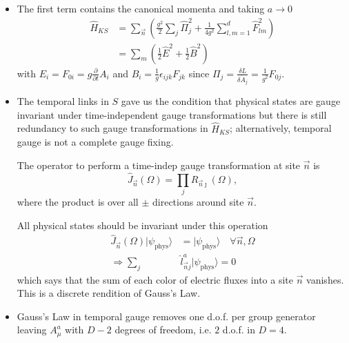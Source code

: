 \begin{itemize}
\begin{itemize}
        where $X$ is an irrelevant constant and $\hat{H}_{KS}$, the contents of the $\{ \}$, is defined to be the Kogut-Susskind Hamiltonian.
        \item The first term contains the canonical momenta and taking $a \rightarrow 0$
        \begin{align*}
            \hat{H}_{KS} &= \sum_{\vec{n}} \left( \frac{g^2}{2} \sum_j \hat{\Pi}_j^2 + \frac{1}{4 g^2} \sum_{l,m = 1}^d \hat{F}_{lm}^2\right)\\
            &= \sum_m\left(\frac{1}{2}\hat{E}^2 + \frac{1}{2}\hat{B}^2\right)
        \end{align*}
        with $E_i = F_{0i} = g \frac{\partial}{\partial t}A_i$ and $B_i = \frac{1}{g} \epsilon_{ijk}F_{jk}$ since $\Pi_j = \frac{\delta L}{\delta \dot{A}_j} = \frac{1}{g^2} F_{0j}$.
        \item The temporal links in $S$ gave us the condition that physical states are gauge invariant under time-independent gauge transformations but there is still redundancy to such gauge transformations in $\hat{H}_{KS}$; alternatively, temporal gauge is not a complete gauge fixing.

        The operator to perform a time-indep gauge transformation  at site $\vec{n}$ is
        \begin{equation}
            \hat J_{\vec{n}}(\Omega) = \prod_j \hat{R}_{\vec{n}\jmath}(\Omega),
        \end{equation}
        where the product is over all $\pm$ directions around site $\vec{n}$.

        All physical states should be invariant under this operation
        \begin{align*}
            \hat J_{\vec{n}}(\Omega)|\psi_{\text{phys}}\rangle &= |\psi_{\text{phys}}\rangle \quad \forall \vec{n}, \Omega\\
            \Rightarrow \sum_j &\hat l_{\vec{n} j}^a |\psi_{\text{phys}}\rangle = 0
        \end{align*}
        which says that the sum of each color of electric fluxes into a site $\vec{n}$ vanishes. This is a discrete rendition of Gauss's Law.
        \item Gauss's Law in temporal gauge removes one d.o.f. per group generator leaving $A_\mu^a$ with $D-2$ degrees of freedom, i.e. $2$ d.o.f. in $D=4$.
  \end{itemize}
\end{itemize}

